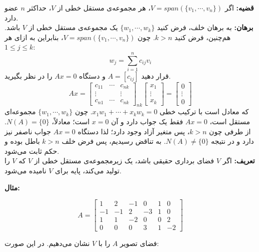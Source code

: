 \textbf{قضیه:}
اگر $V=span(\{v_1,\cdots,v_n\})$، هر مجموعه‌ی مستقل خطی از $V$، حداکثر $n$ عضو دارد.\\
\textbf{برهان:}
به برهان خلف، فرض کنید $\{w_1,\cdots,w_k\}$ یک مجموعه‌ی مستقل خطی از $V$ باشد. هم‌چنین، فرض کنید $k>n$. چون  $V=span(\{v_1,\cdots,v_n\})$، بنابراین به ازای هر $1\leq j \leq k$:
$$w_j= \sum_{i=1}^{n} c_{ij}v_i$$
قرار دهید $A=[c_{ij}]$ و دستگاه $Ax=0$ را در نظر بگیرید.
$$Ax=\begin{bmatrix}
c_{11}&\cdots&c_{nk}\\
\vdots&&\vdots\\
c_{n1}&\cdots&c_{nk}
\end{bmatrix}_{nk}\begin{bmatrix}
x_1\\
\vdots\\
x_k
\end{bmatrix}= \begin{bmatrix}
0\\
\vdots\\
0
\end{bmatrix}$$
که معادل است با ترکیب خطی $x_1w_1+\cdots+x_kw_k=0$. چون  $\{w_1,\cdots,w_k\}$ مجموعه‌ای مستقل است، $Ax=0$ فقط یک جواب دارد و آن $x=0$ است؛ معادلاً، $N(A)=\{0\}$. از طرفی چون $k>n$، پس متغیر آزاد وجود دارد؛ لذا دستگاه $Ax=0$ جواب ناصفر نیز دارد و در نتیجه $N(A)\neq\{0\}$. به تناقض رسیدیم، پس فرض خلف $k>n$ باطل بوده و حکم ثابت می‌شود.\\
\textbf{تعریف:}
اگر $V$ فضا‌ی برداری حقیقی باشد، یک زیر‌مجموعه‌ی مستقل خطی از $V$ که $V$ را تولید می‌کند، پایه برای $V$ نامیده می‌شود.

\textbf{مثال:}

$$A=\begin{bmatrix}
	1 & 2 & -1& 0 &1& 0  \\
	-1 &-1 &2& -3 &1& 0 \\
	1 & 1&-2& 0 &0 &2\\
	0 & 0 &0& 3&1& -2
	\end{bmatrix}
$$

فضای تصویر $A$ را با $V$ نشان می‌دهیم. در این صورت:

